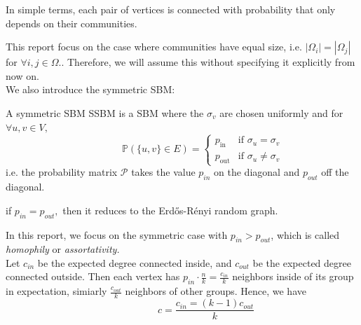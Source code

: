 \begin{remark}
    In simple terms, each pair of vertices is connected with probability that only depends on their communities. 
\end{remark}
This report focus on the case where communities have equal size, i.e. $|\Omega_i|=|\Omega_j|$ for $\forall i, j\in\Omega.$. Therefore, we will assume this without specifying it explicitly from now on.\\

We also introduce the symmetric SBM:
\vspace{-2mm}
\begin{definition}
A symmetric SBM SSBM is a SBM where the $\sigma_v$ are chosen uniformly and for $\forall u, v\in V,$ \begin{equation}
    ~~~~~~~~~~~~~~~~~~~\mathbb{P}\left(\{u,v\}\in E\right) = 
    \begin{cases} 
    p_{\text{in}} & \text{if } \sigma_u = \sigma_v \\
    p_{\text{out}} & \text{if } \sigma_u \neq \sigma_v 
    \end{cases}
\end{equation}
i.e. the probability matrix $\mathcal{P}$ takes the value $p_{in}$ on the diagonal and $p_{out}$ off the diagonal.
\end{definition}
\begin{remark}
    if $p_{in}=p_{out},$ then it reduces to the Erd\H{o}s-R\'{e}nyi random graph.
\end{remark}
In this report, we focus on the symmetric case with $p_{in}>p_{out}$, which is called \textit{homophily} or \textit{assortativity.}\\
Let $c_{in}$ be the expected degree connected inside, and $c_{out}$ be the expected degree connected outside. Then each vertex has $p_{in}\cdot \frac{n}{k}=\frac{c_{in}}{k}$ neighbors inside of its group in expectation, simiarly $\frac{c_{out}}{k}$ neighbors of other groups. Hence, we have\begin{equation}
    ~~~~~~~~~~~~~~~~~~~~~~c=\frac{c_{in}=(k-1)c_{out}}{k}
\end{equation}

